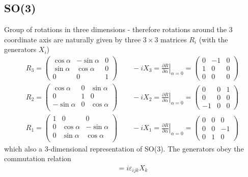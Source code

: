 \documentclass[10pt,a4paper]{article}
\theoremstyle{definition}
\begin{document}
\subsection{SO(3)}
Group of rotations in three dimensions - therefore rotations around the 3 coordinate axis are naturally given by three  $3\times3$ matrices $R_i$ (with the generators $X_i$)
\begin{align}
R_3=\left(\begin{matrix}
\cos\alpha  & -\sin\alpha & 0\\
\sin\alpha & \cos\alpha & 0\\
0 & 0 & 1 
\end{matrix}\right)
\qquad
-iX_3=\left.\frac{\partial R}{\partial\alpha}\right|_{\alpha=0}=\left(\begin{matrix}
0 & -1 & 0\\
1 & 0  & 0\\
0 & 0  & 0
\end{matrix}\right)\\
R_2=\left(\begin{matrix}
\cos\alpha  & 0 & \sin\alpha\\
0 & 1 & 0\\
-\sin\alpha & 0 & \cos\alpha\\
\end{matrix}\right)
\qquad
-iX_2=\left.\frac{\partial R}{\partial\alpha}\right|_{\alpha=0}=\left(\begin{matrix}
0 & 0  & 1\\
0 & 0  & 0\\
-1 & 0  & 0
\end{matrix}\right)\\
R_1=\left(\begin{matrix}
1 & 0 & 0 \\
0 & \cos\alpha & -\sin\alpha\\
0 & \sin\alpha &  \cos\alpha\\
\end{matrix}\right)
\qquad
-iX_1=\left.\frac{\partial R}{\partial\alpha}\right|_{\alpha=0}=\left(\begin{matrix}
0 & 0  & 0\\
0 & 0  & -1\\
0 & 1  & 0
\end{matrix}\right)
\end{align}  
which also a 3-dimensional representation of SO(3). The generators obey the commutation relation 
\begin{align}
[X_i,X_i]=i\varepsilon_{ijk}X_k
\end{align}
\end{document}
